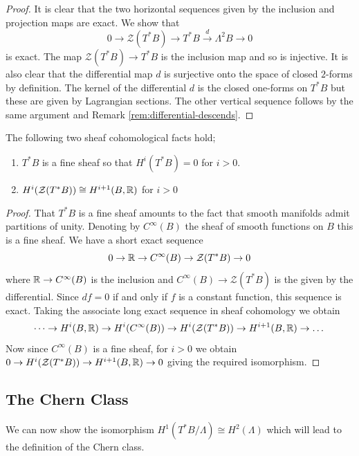 \begin{proof}
    It is clear that the two horizontal sequences given by the inclusion and projection maps are exact. We show that
    $$
        0 \to \mathcal{Z}(T^*B) \to T^*B \xrightarrow{d} \Lambda^2 B \to 0
    $$
    is exact. The map $\mathcal{Z}(T^*B)  \to T^*B$ is the inclusion map and so is injective. It is also clear that the differential
    map $d$ is surjective onto the space of closed $2$-forms by definition. The kernel of the differential $d$ is the closed one-forms on $T^*B$ but these are
    given by Lagrangian sections. The other vertical sequence follows by the same argument and Remark \ref{rem:differential-descends}.
\end{proof}

\begin{lemma}
    The following two sheaf cohomological facts hold;
    \begin{enumerate}
        \item $T^*B$ is a fine sheaf so that $H^i(T^*B) = 0$ for $i>0$.
        \item $H^i(\mathcal{Z}(T^*B)) \cong H^{i+1}(B, \mathbb{R})$ for $i>0$
    \end{enumerate}

\end{lemma}
\begin{proof}

    That $T^*B$ is a fine sheaf amounts to the fact that smooth manifolds admit
    partitions of unity. Denoting by $C^{\infty}(B)$ the sheaf of smooth functions
    on $B$ this is a fine sheaf. We have a short exact sequence $$ 0 \to \mathbb{R} \to
        C^{\infty}(B) \to \mathcal{Z}(T^*B) \to 0 $$ where $\mathbb{R} \to C^{\infty}(B)$ is
    the inclusion and $C^{\infty}(B) \to \mathcal{Z}(T^*B) $ is the given by the
    differential. Since $df = 0$ if and only if $f$ is a constant function, this
    sequence is exact. Taking the associate long exact sequence in sheaf cohomology
    we obtain $$ \dots \to H^i(B, \mathbb{R}) \to H^i(C^{\infty}(B)) \to
        H^i(\mathcal{Z}(T^*B)) \to H^{i+1}(B, \mathbb{R}) \to \dots $$ Now since
    $C^{\infty}(B)$ is a fine sheaf, for $i>0$ we obtain $0\to
        H^i(\mathcal{Z}(T^*B) ) \to H^{i+1}(B, \mathbb{R}) \to 0$ giving the required
    isomorphism.
\end{proof}

\subsection{The Chern Class}
We can now show the isomorphism $H^1(T^*B/\Lambda) \cong H^2(\Lambda)$ which
will lead to the definition of the Chern class.

